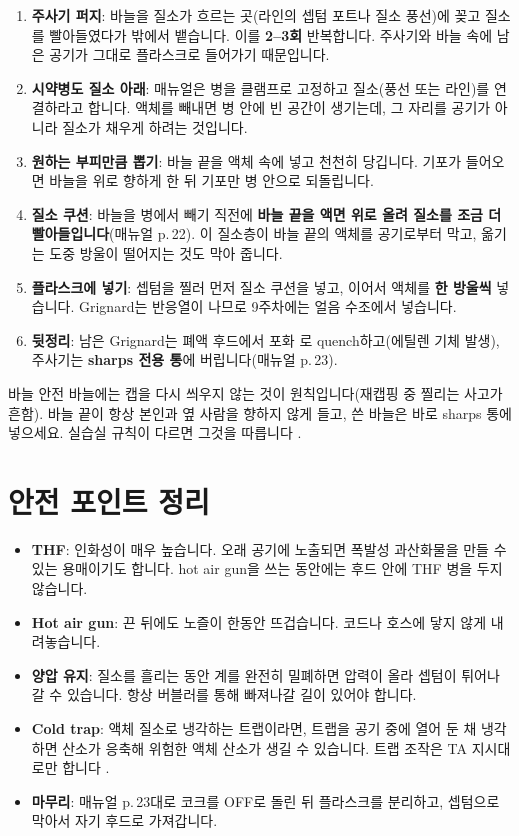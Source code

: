 \documentclass[10pt,a4paper]{article}
\begin{document}
\begin{enumerate}[leftmargin=6mm,itemsep=1.2mm]
\item \textbf{주사기 퍼지}: 바늘을 질소가 흐르는 곳(라인의 셉텀 포트나 질소 풍선)에 꽂고 질소를 빨아들였다가 밖에서 뱉습니다. 이를 \textbf{2--3회} 반복합니다. 주사기와 바늘 속에 남은 공기가 그대로 플라스크로 들어가기 때문입니다.
\item \textbf{시약병도 질소 아래}: 매뉴얼은 병을 클램프로 고정하고 질소(풍선 또는 라인)를 연결하라고 합니다. 액체를 빼내면 병 안에 빈 공간이 생기는데, 그 자리를 공기가 아니라 질소가 채우게 하려는 것입니다.
\item \textbf{원하는 부피만큼 뽑기}: 바늘 끝을 액체 속에 넣고 천천히 당깁니다. 기포가 들어오면 바늘을 위로 향하게 한 뒤 기포만 병 안으로 되돌립니다.
\item \textbf{질소 쿠션}: 바늘을 병에서 빼기 직전에 \textbf{바늘 끝을 액면 위로 올려 질소를 조금 더 빨아들입니다}(매뉴얼 p.\,22). 이 질소층이 바늘 끝의 액체를 공기로부터 막고, 옮기는 도중 방울이 떨어지는 것도 막아 줍니다.
\item \textbf{플라스크에 넣기}: 셉텀을 찔러 먼저 질소 쿠션을 넣고, 이어서 액체를 \textbf{한 방울씩} 넣습니다. Grignard는 반응열이 나므로 9주차에는 얼음 수조에서 넣습니다.
\item \textbf{뒷정리}: 남은 Grignard는 폐액 후드에서 포화 로 quench하고(에틸렌 기체 발생), 주사기는 \textbf{sharps 전용 통}에 버립니다(매뉴얼 p.\,23).
\end{enumerate}

\begin{callout}{바늘 안전}
바늘에는 캡을 다시 씌우지 않는 것이 원칙입니다(재캡핑 중 찔리는 사고가 흔함). 바늘 끝이 항상 본인과 옆 사람을 향하지 않게 들고, 쓴 바늘은 바로 sharps 통에 넣으세요. 실습실 규칙이 다르면 그것을 따릅니다 .
\end{callout}

\section{안전 포인트 정리}
\begin{itemize}[leftmargin=5mm,itemsep=0.8mm]
\item \textbf{THF}: 인화성이 매우 높습니다. 오래 공기에 노출되면 폭발성 과산화물을 만들 수 있는 용매이기도 합니다. hot air gun을 쓰는 동안에는 후드 안에 THF 병을 두지 않습니다.
\item \textbf{Hot air gun}: 끈 뒤에도 노즐이 한동안 뜨겁습니다. 코드나 호스에 닿지 않게 내려놓습니다.
\item \textbf{양압 유지}: 질소를 흘리는 동안 계를 완전히 밀폐하면 압력이 올라 셉텀이 튀어나갈 수 있습니다. 항상 버블러를 통해 빠져나갈 길이 있어야 합니다.
\item \textbf{Cold trap}: 액체 질소로 냉각하는 트랩이라면, 트랩을 공기 중에 열어 둔 채 냉각하면 산소가 응축해 위험한 액체 산소가 생길 수 있습니다. 트랩 조작은 TA 지시대로만 합니다 .
\item \textbf{마무리}: 매뉴얼 p.\,23대로 코크를 OFF로 돌린 뒤 플라스크를 분리하고, 셉텀으로 막아서 자기 후드로 가져갑니다.
\end{itemize}
\end{document}

